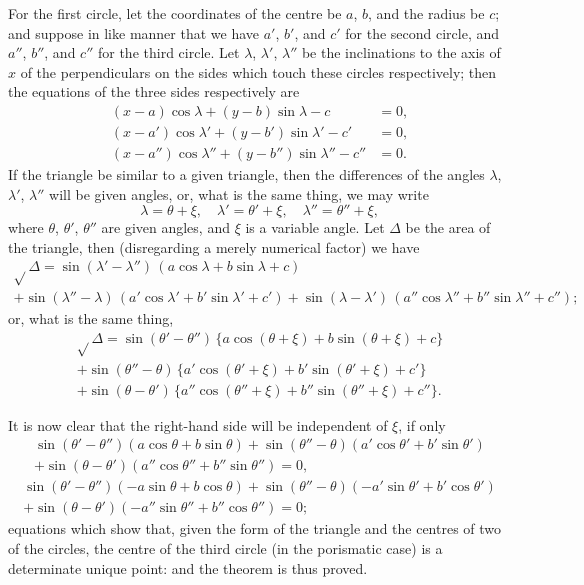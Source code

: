 \documentclass[11pt,a4paper]{article}
\begin{document}
For the first circle, let the coordinates of the centre be $a$, $b$, and the radius
be $c$; and suppose in like manner that we have $a'$, $b'$, and $c'$ for the second circle,
and $a''$, $b''$, and $c''$ for the third circle. Let $\lambda$, $\lambda'$, $\lambda''$ be the inclinations to the axis
of $x$ of the perpendiculars on the sides which touch these circles respectively; then
the equations of the three sides respectively are
\begin{align*}
(x-a)\cos\lambda + (y-b)\sin\lambda - c &= 0,\\
(x-a')\cos\lambda' + (y-b')\sin\lambda' - c' &= 0,\\
(x-a'')\cos\lambda'' + (y-b'')\sin\lambda'' - c'' &= 0.
\end{align*}
If the triangle be similar to a given triangle, then the differences of the angles
$\lambda$, $\lambda'$, $\lambda''$ will be given angles, or, what is the same thing, we may write
\[
\lambda = \theta + \xi, \quad \lambda' = \theta' + \xi, \quad \lambda'' = \theta'' + \xi,
\]
where $\theta$, $\theta'$, $\theta''$ are given angles, and $\xi$ is a variable angle. Let $\Delta$ be the area of
the triangle, then (disregarding a merely numerical factor) we have
\begin{multline*}
\sqrt{}\Delta = \sin(\lambda'-\lambda'')\,(a\cos\lambda + b\sin\lambda + c)\\
+ \sin(\lambda''-\lambda)\,(a'\cos\lambda' + b'\sin\lambda' + c') + \sin(\lambda-\lambda')\,(a''\cos\lambda'' + b''\sin\lambda'' + c'');
\end{multline*}
or, what is the same thing,
\begin{multline*}
\sqrt{}\Delta = \sin(\theta'-\theta'')\,\{a\cos(\theta+\xi) + b\sin(\theta+\xi) + c\}\\
+ \sin(\theta''-\theta)\,\{a'\cos(\theta'+\xi) + b'\sin(\theta'+\xi) + c'\}\\
+ \sin(\theta-\theta')\,\{a''\cos(\theta''+\xi) + b''\sin(\theta''+\xi) + c''\}.
\end{multline*}

It is now clear that the right-hand side will be independent of $\xi$, if only
\begin{multline*}
\sin(\theta'-\theta'')(a\cos\theta + b\sin\theta) + \sin(\theta''-\theta)(a'\cos\theta' + b'\sin\theta')\\
+ \sin(\theta-\theta')(a''\cos\theta'' + b''\sin\theta'') = 0,
\end{multline*}
\begin{multline*}
\sin(\theta'-\theta'')(-a\sin\theta + b\cos\theta) + \sin(\theta''-\theta)(-a'\sin\theta' + b'\cos\theta')\\
+ \sin(\theta-\theta')(-a''\sin\theta'' + b''\cos\theta'') = 0;
\end{multline*}
equations which show that, given the form of the triangle and the centres of two of
the circles, the centre of the third circle (in the porismatic case) is a determinate
unique point: and the theorem is thus proved.
\end{document}
